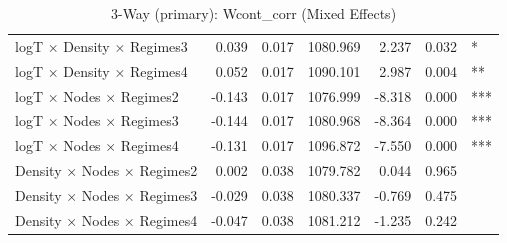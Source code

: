 \begin{table}[ht]
\begin{tabular}{lrrrrrl}
  logT × Density × Regimes3 & 0.039 & 0.017 & 1080.969 & 2.237 & 0.032 & * \\ 
  logT × Density × Regimes4 & 0.052 & 0.017 & 1090.101 & 2.987 & 0.004 & ** \\ 
  logT × Nodes × Regimes2 & -0.143 & 0.017 & 1076.999 & -8.318 & 0.000 & *** \\ 
  logT × Nodes × Regimes3 & -0.144 & 0.017 & 1080.968 & -8.364 & 0.000 & *** \\ 
  logT × Nodes × Regimes4 & -0.131 & 0.017 & 1096.872 & -7.550 & 0.000 & *** \\ 
  Density × Nodes × Regimes2 & 0.002 & 0.038 & 1079.782 & 0.044 & 0.965 &  \\ 
  Density × Nodes × Regimes3 & -0.029 & 0.038 & 1080.337 & -0.769 & 0.475 &  \\ 
  Density × Nodes × Regimes4 & -0.047 & 0.038 & 1081.212 & -1.235 & 0.242 &  \\ 
   \hline
\end{tabular}
\caption{3-Way (primary): Wcont_corr (Mixed Effects)} 
\end{table}
